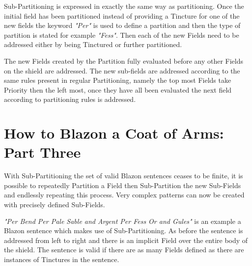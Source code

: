 Sub-Partitioning is expressed in exactly the same way as partitioning. Once the initial field has been partitioned instead of providing a Tincture for one of the new fields the keyword \emph{"Per"} is used to define a partition and then the type of partition is stated for example \emph{"Fess"}.  Then each of the new Fields need to be addressed either by being Tinctured or further partitioned. 

The new Fields created by the Partition fully evaluated before any other Fields on the shield are addressed.  The new sub-fields are addressed according to the same rules present in regular Partitioning, namely the top most Fields take Priority then the left most, once they have all been evaluated the next field according to partitioning rules is addressed.

\section{How to Blazon a Coat of Arms: Part Three}

With Sub-Partitioning the set of valid Blazon sentences ceases to be finite, it is possible to repeatedly Partition a Field then Sub-Partition the new Sub-Fields and endlessly repeating this process.  Very complex patterns can now be created with precisely defined Sub-Fields.

\emph{"Per Bend Per Pale Sable and Argent Per Fess Or and Gules"} is an example a Blazon sentence which makes use of Sub-Partitioning.  As before  the sentence is addressed from left to right and there is an implicit Field over the entire body of the shield.  The sentence is valid if there are as many Fields defined as there are instances of Tinctures in the sentence. 


